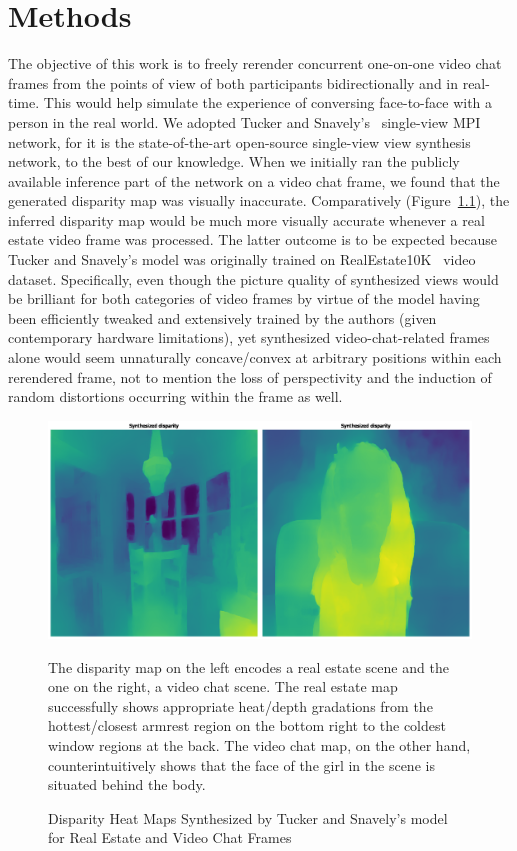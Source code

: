 \chapter{Methods}\label{ch3:methods}

The objective of this work is to freely rerender concurrent one-on-one video chat frames from the points of view of both participants bidirectionally and in real-time. This would help simulate the experience of conversing face-to-face with a person in the real world. We adopted Tucker and Snavely's~\cite{single_view_mpi} single-view MPI network, for it is the state-of-the-art open-source single-view view synthesis network, to the best of our knowledge. When we initially ran the publicly available inference part of the network on a video chat frame, we found that the generated disparity map was visually inaccurate. Comparatively (Figure~\ref{fig:great-off-kilter-disparity}), the inferred disparity map would be much more visually accurate whenever a real estate video frame was processed. The latter outcome is to be expected because Tucker and Snavely's model was originally trained on RealEstate10K~\cite{zhou2018stereo} video dataset. Specifically, even though the picture quality of synthesized views would be brilliant for both categories of video frames by virtue of the model having been efficiently tweaked and extensively trained by the authors (given contemporary hardware limitations), yet synthesized video-chat-related frames alone would seem unnaturally concave/convex at arbitrary positions within each rerendered frame, not to mention the loss of perspectivity and the induction of random distortions occurring within the frame as well.

\begin{figure}[!h]
    \includegraphics[width=0.75\columnwidth]{figures/great-off-kilter-disparity.png}
    \caption{Disparity Heat Maps Synthesized by Tucker and Snavely's model~\cite{single_view_mpi} for Real Estate and Video Chat Frames}
    \label{fig:great-off-kilter-disparity}
    {\small The disparity map on the left encodes a real estate scene and the one on the right, a video chat scene. The real estate map successfully shows appropriate heat/depth gradations from the hottest/closest armrest region on the bottom right to the coldest window regions at the back. The video chat map, on the other hand, counterintuitively shows that the face of the girl in the scene is situated behind the body.}  
\end{figure}

